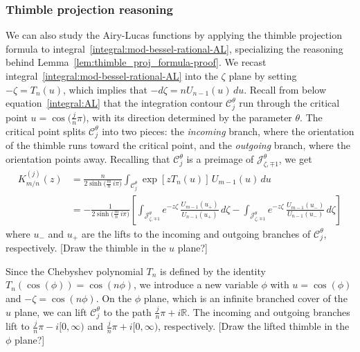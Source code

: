 \documentclass{article}
\newcommand{\R}{\mathbb{R}}
\theoremstyle{definition}
\theoremstyle{plain}
\newenvironment{todo}{\color{Coral}}{\color{black}}
\begin{document}
\subsubsection{Thimble projection reasoning}\label{contour-argument-AL}
We can also study the Airy-Lucas functions by applying the thimble projection formula to integral~\eqref{integral:mod-bessel-rational-AL}, specializing the reasoning behind Lemma~\ref{lem:thimble_proj_formula-proof}. We recast integral~\eqref{integral:mod-bessel-rational-AL} into the $\zeta$ plane by setting $-\zeta = T_n(u)$, which implies that $-d\zeta = n U_{n-1}(u)\,du$. Recall from below equation~\eqref{integral:AL} that the integration contour $\mathcal{C}^\theta_j$ run through the critical point $u = \cos\big(\tfrac{j}{n}\pi\big)$, with its direction determined by the parameter $\theta$. The critical point splits $\mathcal{C}^\theta_j$ into two pieces: the {\em incoming} branch, where the orientation of the thimble runs toward the critical point, and the {\em outgoing} branch, where the orientation points away. Recalling that $\mathcal{C}^\theta_j$ is a preimage of $\mathcal{J}^\theta_{\zeta, \mp 1}$, we get
\begin{align*}%
K^{(j)}_{m/n}(z) & = \frac{n}{2 \sinh\big(\tfrac{m}{n}\,i\pi\big)} \int_{\mathcal{C}^\theta_j} \exp\left[z T_n(u)\right]\,U_{m-1}(u)\,du \\
& = -\frac{1}{2\sinh\big(\tfrac{m}{n}\,i\pi\big)} \left[ \int_{\mathcal{J}^\theta_{\zeta, \mp 1}} e^{-z\zeta}\,\frac{U_{m-1}(u_+)}{U_{n-1}(u_+)}\,d\zeta - \int_{\mathcal{J}^\theta_{\zeta, \mp 1}} e^{-z\zeta}\,\frac{U_{m-1}(u_-)}{U_{n-1}(u_-)}\,d\zeta \right]
\end{align*}
where $u_-$ and $u_+$ are the lifts to the incoming and outgoing branches of $\mathcal{C}^\theta_j$, respectively. \begin{todo}[Draw the thimble in the $u$ plane?]\end{todo}

Since the Chebyshev polynomial $T_n$ is defined by the identity $T_n(\cos(\phi)) = \cos(n\phi)$, we introduce a new variable $\phi$ with $u = \cos(\phi)$ and $-\zeta = \cos(n\phi)$. On the $\phi$ plane, which is an infinite branched cover of the $u$ plane, we can lift $\mathcal{C}^\theta_j$ to the path $\tfrac{j}{n}\pi + i\R$. The incoming and outgoing branches lift to $\tfrac{j}{n}\pi - i[0, \infty)$ and $\tfrac{j}{n}\pi + i[0, \infty)$, respectively. \begin{todo}[Draw the lifted thimble in the $\phi$ plane?]\end{todo}
\end{document}
